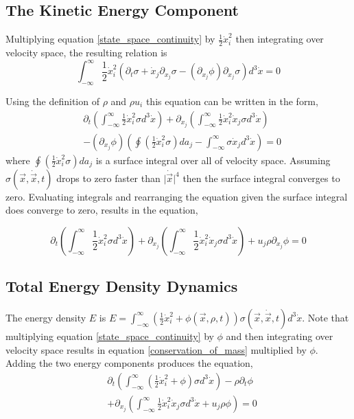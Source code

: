 \documentclass[%
 twocolumn,
 amsmath,amssymb,
 aps,
]{revtex4-1}
\newcommand{\dvec}[1]{\dot{\vec{#1}}}
\newcommand{\intVdot}[1]{\int_{-\infty}^{\infty} #1 d^3\dot{x}}
\begin{document}
\subsection{The Kinetic Energy Component}
Multiplying equation \eqref{state_space_continuity} by $\frac{1}{2}\dot{x}_i^2$ then integrating over velocity space, the resulting relation is
\[
\intVdot{\frac{1}{2}\dot{x}_i^2\left(\partial_t \sigma + \dot{x}_j\partial_{x_j}\sigma-\left(\partial_{x_j}\phi\right)\partial_{\dot{x}_j}\sigma\right)}=0
\]

Using the definition of $\rho$ and $\rho u_i$ this equation can be written in the form,
\[
\begin{split}
& \partial_t\left(\intVdot{\frac{1}{2}\dot{x}_i^2\sigma}\right) + \partial_{x_j}\left(\intVdot{\frac{1}{2}\dot{x}_i^2\dot{x}_j\sigma}\right) \\ & -  \left(\partial_{x_j}\phi\right)\left(\oint\left(\frac{1}{2}\dot{x}_i^2\sigma\right)da_j - \intVdot{\sigma\dot{x}_j}\right)=0
\end{split}
\]
where $\oint\left(\frac{1}{2}\dot{x}_i^2\sigma\right)da_j$ is a surface integral over all of velocity space. Assuming $\sigma(\vec{x}, \dvec{x}, t)$ drops to zero faster than $\lvert\dvec{x}\rvert^4$ then the surface integral converges to zero. Evaluating integrals and rearranging the equation given the surface integral does converge to zero, results in the equation,

\begin{equation}
\partial_t\left(\intVdot{\frac{1}{2}\dot{x}_i^2\sigma}\right) + \partial_{x_j}\left(\intVdot{\frac{1}{2}\dot{x}_i^2\dot{x}_j\sigma}\right) + u_j\rho\partial_{x_j}\phi=0
\label{incomplete_conservation_of_energy_kinetic}
\end{equation}

\subsection{Total Energy Density Dynamics}
The energy density $E$ is $E=\intVdot{\left(\frac{1}{2}\dot{x}_i^2 + \phi(\vec{x}, \rho, t)\right)\sigma(\vec{x}, \dvec{x}, t)}$. Note that multiplying equation \eqref{state_space_continuity} by $\phi$ and then integrating over velocity space results in equation \eqref{conservation_of_mass} multiplied by $\phi$. Adding the two energy components produces the equation,
\[
\begin{split}
& \partial_t\left(\intVdot{\left(\frac{1}{2}\dot{x}_i^2 + \phi\right)\sigma}\right) - \rho\partial_t\phi \\& + \partial_{x_j}\left(\intVdot{\frac{1}{2}\dot{x}_i^2\dot{x}_j\sigma} + u_j\rho\phi\right)=0
\end{split}
\]
\end{document}

